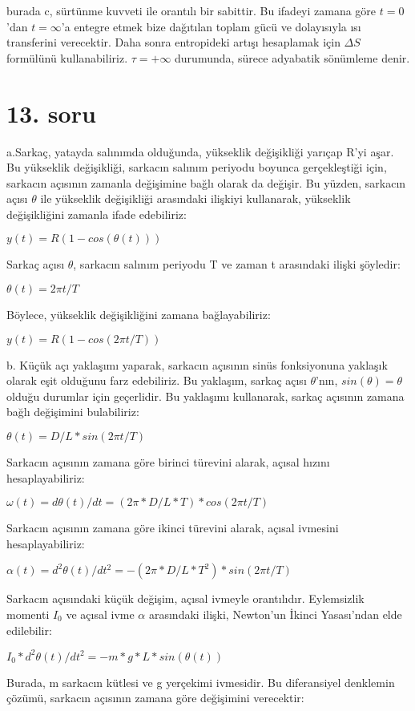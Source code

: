\documentclass[12pt]{article}
\begin{document}
burada c, sürtünme kuvveti ile orantılı bir sabittir. Bu ifadeyi zamana göre $t = 0$'dan $t = \infty$'a entegre etmek bize dağıtılan toplam gücü ve dolayısıyla ısı transferini verecektir. Daha sonra entropideki artışı hesaplamak için $\Delta S$ formülünü kullanabiliriz. $\tau=+\infty$  durumunda, sürece adyabatik sönümleme denir.
\newpage
\section{13. soru}
a.Sarkaç, yatayda salınımda olduğunda, yükseklik değişikliği yarıçap R'yi aşar. Bu yükseklik değişikliği, sarkacın salınım periyodu boyunca gerçekleştiği için, sarkacın açısının zamanla değişimine bağlı olarak da değişir. Bu yüzden, sarkacın açısı $\theta$ ile yükseklik değişikliği arasındaki ilişkiyi kullanarak, yükseklik değişikliğini zamanla ifade edebiliriz:

$y(t) = R(1 - cos(\theta(t)))$

Sarkaç açısı $\theta$, sarkacın salınım periyodu T ve zaman t arasındaki ilişki şöyledir:

$\theta(t) = 2\pi t / T$

Böylece, yükseklik değişikliğini zamana bağlayabiliriz:

$y(t) = R(1 - cos(2\pi t / T))$

b. Küçük açı yaklaşımı yaparak, sarkacın açısının sinüs fonksiyonuna yaklaşık olarak eşit olduğunu farz edebiliriz. Bu yaklaşım, sarkaç açısı $\theta$'nın, $sin(\theta) = \theta$ olduğu durumlar için geçerlidir. Bu yaklaşımı kullanarak, sarkaç açısının zamana bağlı değişimini bulabiliriz:

$\theta(t) = D / L * sin(2\pi t / T)$

Sarkacın açısının zamana göre birinci türevini alarak, açısal hızını hesaplayabiliriz:

$\omega(t) = d\theta(t) / dt = (2\pi * D / L * T) * cos(2\pi t / T)$

Sarkacın açısının zamana göre ikinci türevini alarak, açısal ivmesini hesaplayabiliriz:

$\alpha(t) = d^2\theta(t) / dt^2 = -(2\pi * D / L * T^2) * sin(2\pi t / T)$

Sarkacın açısındaki küçük değişim, açısal ivmeyle orantılıdır. Eylemsizlik momenti $I_0$ ve açısal ivme $\alpha$ arasındaki ilişki, Newton'un İkinci Yasası'ndan elde edilebilir:

$I_0 * d^2\theta(t) / dt^2 = -m * g * L * sin(\theta(t))$

Burada, m sarkacın kütlesi ve g yerçekimi ivmesidir. Bu diferansiyel denklemin çözümü, sarkacın açısının zamana göre değişimini verecektir:
\end{document}
